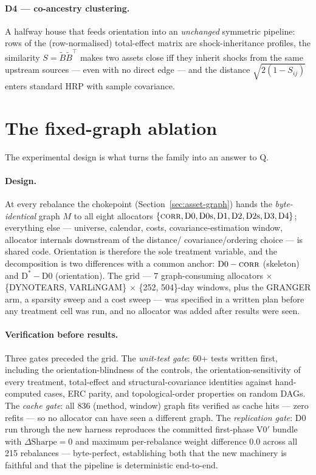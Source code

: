 \paragraph{D4 --- co-ancestry clustering.} A halfway house that feeds
orientation into an \emph{unchanged} symmetric pipeline: rows of the
(row-normalised) total-effect matrix are shock-inheritance profiles, the
similarity $S = \tilde{B}\tilde{B}^\top$ makes two assets close iff they
inherit shocks from the same upstream sources --- even with no direct edge
--- and the distance $\sqrt{2(1-S_{ij})}$ enters standard HRP with sample
covariance.

\section{The fixed-graph ablation}
\label{sec:ablation-design}

The experimental design is what turns the family into an answer to Q.

\paragraph{Design.} At every rebalance the chokepoint
(Section~\ref{sec:asset-graph}) hands the \emph{byte-identical} graph $M$ to
all eight allocators
$\{\textsc{corr},\text{D0},\text{D0s},\text{D1},\text{D2},\text{D2s},
\text{D3},\text{D4}\}$; everything else --- universe, calendar, costs,
covariance-estimation window, allocator internals downstream of the distance/
covariance/ordering choice --- is shared code. Orientation is therefore the
sole treatment variable, and the decomposition is two differences with a
common anchor: $\text{D0}-\textsc{corr}$ (skeleton) and
$\text{D}^{*}-\text{D0}$ (orientation). The grid --- 7 graph-consuming
allocators $\times$ \{DYNOTEARS, VARLiNGAM\} $\times$ \{252, 504\}-day
windows, plus the GRANGER arm, a sparsity sweep and a cost sweep --- was
specified in a written plan before any treatment cell was run, and no
allocator was added after results were seen.

\paragraph{Verification before results.} Three gates preceded the grid.
The \emph{unit-test gate}: 60+ tests written first, including the
orientation-blindness of the controls, the orientation-sensitivity of every
treatment, total-effect and structural-covariance identities against
hand-computed cases, ERC parity, and topological-order properties on random
DAGs. The \emph{cache gate}: all 836 (method, window) graph fits verified as
cache hits --- zero refits --- so no allocator can have seen a different
graph. The \emph{replication gate}: D0 run through the new harness reproduces
the committed first-phase V0$'$ bundle with $\Delta\text{Sharpe}=0$ and
maximum per-rebalance weight difference $0.0$ across all 215 rebalances ---
byte-perfect, establishing both that the new machinery is faithful and that
the pipeline is deterministic end-to-end.

